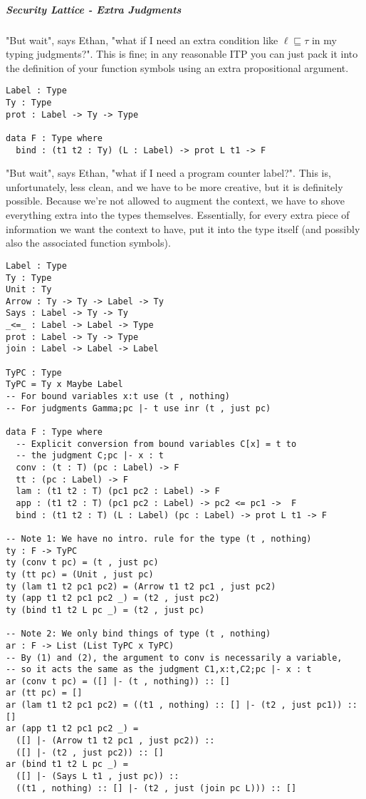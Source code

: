 \documentclass{article}
\theoremstyle{definition}
\begin{document}
\subparagraph{Security Lattice - Extra Judgments} "But wait", says Ethan, "what if I need an extra condition like $\ell \sqsubseteq \tau$ in my typing judgments?". This is fine; in any reasonable ITP you can just pack it into the definition of your function symbols using an extra propositional argument.
\begin{verbatim}
Label : Type
Ty : Type
prot : Label -> Ty -> Type

data F : Type where
  bind : (t1 t2 : Ty) (L : Label) -> prot L t1 -> F
\end{verbatim}
"But wait", says Ethan, "what if I need a program counter label?". This is, unfortunately, less clean, and we have to be more creative, but it is definitely possible. Because we're not allowed to augment the context, we have to shove everything extra into the types themselves. Essentially, for every extra piece of information we want the context to have, put it into the type itself (and possibly also the associated function symbols).
\begin{verbatim}		
Label : Type
Ty : Type
Unit : Ty
Arrow : Ty -> Ty -> Label -> Ty
Says : Label -> Ty -> Ty
_<=_ : Label -> Label -> Type
prot : Label -> Ty -> Type
join : Label -> Label -> Label

TyPC : Type
TyPC = Ty x Maybe Label
-- For bound variables x:t use (t , nothing)
-- For judgments Gamma;pc |- t use inr (t , just pc)

data F : Type where
  -- Explicit conversion from bound variables C[x] = t to
  -- the judgment C;pc |- x : t
  conv : (t : T) (pc : Label) -> F
  tt : (pc : Label) -> F
  lam : (t1 t2 : T) (pc1 pc2 : Label) -> F
  app : (t1 t2 : T) (pc1 pc2 : Label) -> pc2 <= pc1 ->  F
  bind : (t1 t2 : T) (L : Label) (pc : Label) -> prot L t1 -> F

-- Note 1: We have no intro. rule for the type (t , nothing)
ty : F -> TyPC
ty (conv t pc) = (t , just pc)
ty (tt pc) = (Unit , just pc)
ty (lam t1 t2 pc1 pc2) = (Arrow t1 t2 pc1 , just pc2)
ty (app t1 t2 pc1 pc2 _) = (t2 , just pc2)
ty (bind t1 t2 L pc _) = (t2 , just pc)

-- Note 2: We only bind things of type (t , nothing)
ar : F -> List (List TyPC x TyPC)
-- By (1) and (2), the argument to conv is necessarily a variable,
-- so it acts the same as the judgment C1,x:t,C2;pc |- x : t
ar (conv t pc) = ([] |- (t , nothing)) :: []
ar (tt pc) = []
ar (lam t1 t2 pc1 pc2) = ((t1 , nothing) :: [] |- (t2 , just pc1)) :: []
ar (app t1 t2 pc1 pc2 _) =
  ([] |- (Arrow t1 t2 pc1 , just pc2)) ::
  ([] |- (t2 , just pc2)) :: []
ar (bind t1 t2 L pc _) =
  ([] |- (Says L t1 , just pc)) ::
  ((t1 , nothing) :: [] |- (t2 , just (join pc L))) :: []
\end{verbatim}
\end{document}
